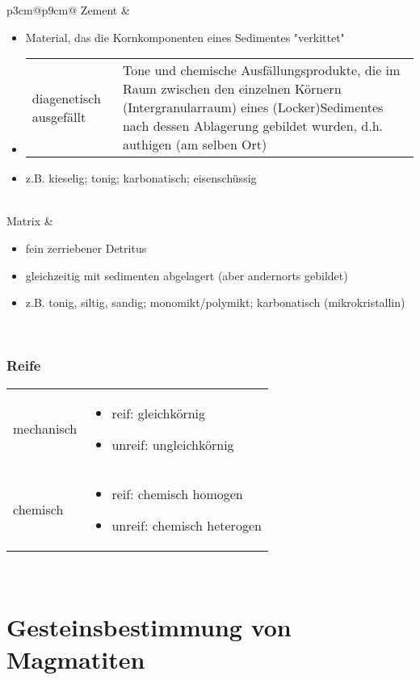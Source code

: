 \documentclass[a4, 12pt]{scrreprt}
\begin{document}
\begin{tabular}{p{3cm}@{}p{9cm}@{}}
Zement & 
	\begin{itemize}
	\item Material, das die Kornkomponenten eines Sedimentes "verkittet"
	\item 
		\begin{tabular}{p{3cm}@{}p{6cm}@{}}
		diagenetisch ausgefällt & Tone und chemische Ausfällungsprodukte, die im Raum zwischen den einzelnen Körnern (Intergranularraum) eines (Locker)Sedimentes nach dessen Ablagerung gebildet wurden, d.h. authigen (am selben Ort)\\
		\end{tabular}
	\item z.B. kieselig; tonig; karbonatisch; eisenschüssig
	\end{itemize}\\
	
Matrix & 
	\begin{itemize}
	\item fein zerriebener Detritus
	\item gleichzeitig mit sedimenten abgelagert (aber andernorts gebildet)
	\item z.B. tonig, siltig, sandig; monomikt/polymikt; karbonatisch (mikrokristallin)
	\end{itemize}\\
\end{tabular}



\section{Reife}

\begin{tabular}{p{3cm}@{}p{9cm}@{}}
mechanisch & 
	\begin{itemize}
	\item reif: gleichkörnig
	\item unreif: ungleichkörnig
	\end{itemize}\\
chemisch &
	\begin{itemize}
	\item reif: chemisch homogen
	\item unreif: chemisch heterogen
	\end{itemize}
\end{tabular}\\


\part{Gesteinsbestimmung von Magmatiten}
\end{document}
